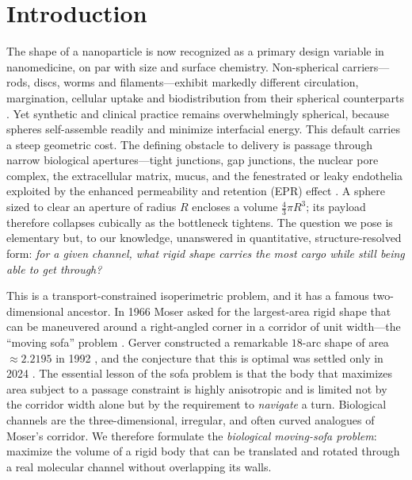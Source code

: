 \documentclass[aps,pre,twocolumn,superscriptaddress,floatfix,nofootinbib]{revtex4-2}
\begin{document}
\maketitle

\section{Introduction}

The shape of a nanoparticle is now recognized as a primary design variable in
nanomedicine, on par with size and surface chemistry. Non-spherical
carriers---rods, discs, worms and filaments---exhibit markedly different
circulation, margination, cellular uptake and biodistribution from their
spherical counterparts \cite{champion2006,geng2007,decuzzi2006,toy2014shape,
kinnear2017}. Yet synthetic and clinical practice remains overwhelmingly
spherical, because spheres self-assemble readily and minimize interfacial
energy. This default carries a steep geometric cost. The defining obstacle to
delivery is passage through narrow biological apertures---tight junctions,
gap junctions, the nuclear pore complex, the extracellular matrix, mucus, and
the fenestrated or leaky endothelia exploited by the enhanced permeability and
retention (EPR) effect \cite{pante2002,lai2009mucus,matsumura1986epr}. A sphere
sized to clear an aperture of radius $R$ encloses a volume $\tfrac{4}{3}\pi R^3$;
its payload therefore collapses cubically as the bottleneck tightens. The
question we pose is elementary but, to our knowledge, unanswered in quantitative,
structure-resolved form: \emph{for a given channel, what rigid shape carries the
most cargo while still being able to get through?}

This is a transport-constrained isoperimetric problem, and it has a famous
two-dimensional ancestor. In 1966 Moser asked for the largest-area rigid shape
that can be maneuvered around a right-angled corner in a corridor of unit
width---the ``moving sofa'' problem \cite{moser1966}. Gerver constructed a
remarkable $18$-arc shape of area $\approx 2.2195$ in 1992 \cite{gerver1992},
and the conjecture that this is optimal was settled only in 2024
\cite{baek2024}. The essential lesson of the sofa problem is that the body that
maximizes area subject to a passage constraint is highly anisotropic and is
limited not by the corridor width alone but by the requirement to \emph{navigate}
a turn. Biological channels are the three-dimensional, irregular, and often
curved analogues of Moser's corridor. We therefore formulate the
\emph{biological moving-sofa problem}: maximize the volume of a rigid body that
can be translated and rotated through a real molecular channel without overlapping
its walls.
\end{document}
